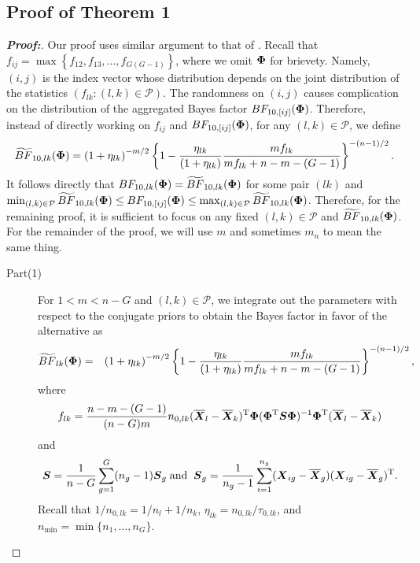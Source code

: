 \documentclass[pdflatex,sn-basic]{sn-jnl}%
\def\bse{\begin{eqnarray*}}
\def\ese{\end{eqnarray*}}
\def\be{\begin{eqnarray}}
\def\ee{\end{eqnarray}}
\def\trans{^{\rm T}}
\newcommand{\uS}       {\mbox{\boldmath$S$}}
\newcommand{\uX}       {\mbox{\boldmath$X$}}
\newcommand{\uPhi}              {\mbox{\boldmath$\Phi$}}
\theoremstyle{thmstyleone}%
\theoremstyle{thmstyletwo}%
\theoremstyle{thmstylethree}%
\begin{document}
\begin{appendices}
\section{Proof of Theorem 1} \label{secA1}
\begin{proof}[\textbf{\upshape Proof:}]
Our proof uses similar argument to that of \cite{zoh2018powerful}. 
Recall that $f_{ij} = \max\left\{f_{12}, f_{13}, \ldots, f_{G(G-1)} \right\}$, where we omit $\uPhi$ for brievety. Namely, $(i, j)$ is the index vector whose distribution depends on the joint distribution of the statistics $(f_{lk}:(l, k)\in\mathcal{P})$. The randomness on $(i, j)$ causes complication on the distribution of the aggregated Bayes factor $BF_{10,[ij]}(\uPhi)$. 
Therefore, instead of directly working on $f_{ij}$ and $BF_{10, [ij]}(\uPhi)$, for any $(l, k)\in\mathcal{P}$, we define 
\[
\widetilde{BF}_{10,lk}(\uPhi) = \left(1 + \eta_{lk} \right)^{-m/2} \left\{ 1 - \frac{\eta_{lk}}{(1 + \eta_{lk})}\frac{ m f_{lk}}{ m f_{lk}  + n - m - (G-1)} \right\}^{-(n-1)/2}.
\]
It follows directly that $BF_{10,lk}(\uPhi) = \widetilde{BF}_{10,lk}(\uPhi)$ for some pair $(lk)$ and $\min_{(l,k)\in\mathcal{P}}\widetilde{BF}_{10,lk}(\uPhi)\leq BF_{10, [ij]}(\uPhi)\leq \max_{(l,k)\in\mathcal{P}}\widetilde{BF}_{10,lk}(\uPhi)$. Therefore, for the remaining proof, it is sufficient to focus on any fixed $(l, k)\in\mathcal{P}$ and $\widetilde{BF}_{10, lk}(\uPhi)$. For the remainder of the proof, we will use $m$ and sometimes $m_n$ to mean the same thing. 
\begin{description}
\item[Part(1)]
For $1 < m < n - G$ and 
$(l, k)\in\mathcal{P}$,
we integrate out the parameters with respect to the conjugate priors to obtain the Bayes factor in favor of the alternative as
\be
\widetilde{BF}_{lk}(\uPhi) &=&
\left(1 + \eta_{lk} \right)^{-m/2} \left\{ 1 - \frac{\eta_{lk}}{(1 + \eta_{lk})}\frac{ m f_{lk}}{ m f_{lk}  + n - m - (G-1)} \right\}^{-(n-1)/2} 
\nonumber,
\ee
where
\bse
f_{lk}  = \frac{n - m - (G-1)}{(n-G)m} n_{0,lk}(\overline{\uX}_l - \overline{\uX}_k)\trans \uPhi(\uPhi\trans \uS\uPhi )^{-1}\uPhi\trans (\overline{\uX}_l - \overline{\uX}_k)
\ese
and $$ \uS = \frac{1}{n - G} \sum^{G}_{g=1}(n_g -1)\uS_{g}\; \text{and} \;\; \uS_g = \frac{1}{n_g - 1}\sum^{n_g}_{i=1}(\uX_{ig} - \overline{\uX}_{g})(\uX_{ig} - \overline{\uX}_{g})\trans.$$
Recall that $1/n_{0,lk} = 1/n_l + 1/n_k$, $\eta_{lk} = n_{0,lk}/\tau_{0,lk}$, and $n_{\min} = \min\{n_1, \ldots, n_G\}$.

\end{description}
\end{proof}
\end{appendices}
\end{document}
